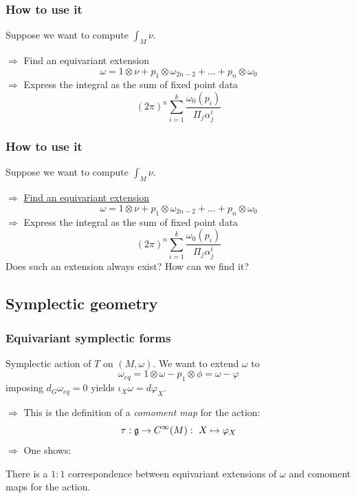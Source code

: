 \documentclass{beamer}
\begin{document}
\begin{frame}
\frametitle{How to use it}
Suppose we want to compute
$
\int_M\nu
$.\par
$\Rightarrow$ Find an equivariant extension
\[
\omega=1\otimes \nu+p_1\otimes \omega_{2n-2}+\dots+p_{n}\otimes \omega_0
\]
$\Rightarrow$ Express the integral as the sum of fixed point data \[(2\pi)^n\sum_{i=1}^k\frac{\omega_0(p_i)}{\Pi_{j}\alpha^i_j}\]
\end{frame}


\begin{frame}
\frametitle{How to use it}
Suppose we want to compute
$
\int_M\nu
$.\par
$\Rightarrow$ \color{red} \underline{Find an equivariant extension}\color{black}
\[
\omega=1\otimes \nu+p_1\otimes \omega_{2n-2}+\dots+p_{n}\otimes \omega_0
\]
$\Rightarrow$ Express the integral as the sum of fixed point data \[(2\pi)^n\sum_{i=1}^k\frac{\omega_0(p_i)}{\Pi_{j}\alpha^i_j}\]
Does such an extension always exist? How can we find it?
\end{frame}


\subsection{Symplectic geometry}
\begin{frame}
\frametitle{Equivariant symplectic forms}
Symplectic action of $T$ on $(M,\omega)$. We want to extend $\omega$ to
\[
\omega_{eq}=1\otimes\omega - p_1\otimes \phi=\omega-\varphi
\]
imposing $d_G\omega_{eq}=0$ yields $\iota_X\omega=d\varphi_X$.\par
$\Rightarrow$ This is the definition of a \emph{comoment map} for the action:
\[
\tau:\frak g\to C^\infty(M):\ X\mapsto \varphi_X
\]
$\Rightarrow$ One shows:
\begin{theorem}
There is a $1:1$ correspondence between equivariant extensions of $\omega$ and comoment maps for the action.
\end{theorem}
\end{frame}
\end{document}
